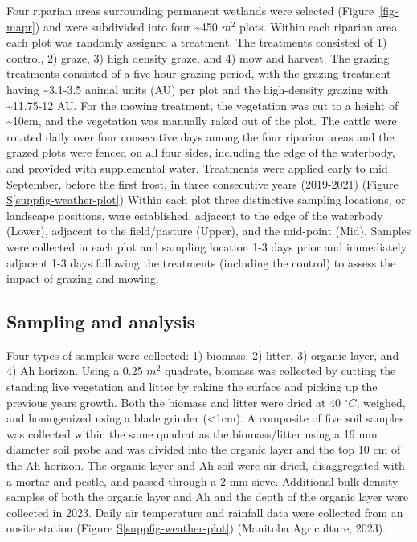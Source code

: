 \documentclass[
]{agujournal2019}
\newcommand*\quartosuppfigref[1]{Figure \hyperref[#1]{S\ref{#1}}}
\begin{document}
Four riparian areas surrounding permanent wetlands were selected
(Figure~\ref{fig-mapr}) and were subdivided into four \textasciitilde450
\(m^2\) plots. Within each riparian area, each plot was randomly
assigned a treatment. The treatments consisted of 1) control, 2) graze,
3) high density graze, and 4) mow and harvest. The grazing treatments
consisted of a five-hour grazing period, with the grazing treatment
having \textasciitilde3.1-3.5 animal units (AU) per plot and the
high-density grazing with \textasciitilde11.75-12 AU. For the mowing
treatment, the vegetation was cut to a height of \textasciitilde10cm,
and the vegetation was manually raked out of the plot. The cattle were
rotated daily over four consecutive days among the four riparian areas
and the grazed plots were fenced on all four sides, including the edge
of the waterbody, and provided with supplemental water. Treatments were
applied early to mid September, before the first frost, in three
consecutive years (2019-2021) (\quartosuppfigref{suppfig-weather-plot})
Within each plot three distinctive sampling locations, or landscape
positions, were established, adjacent to the edge of the waterbody
(Lower), adjacent to the field/pasture (Upper), and the mid-point (Mid).
Samples were collected in each plot and sampling location 1-3 days prior
and immediately adjacent 1-3 days following the treatments (including
the control) to assess the impact of grazing and mowing.

\subsection{Sampling and analysis}\label{sampling-and-analysis}

Four types of samples were collected: 1) biomass, 2) litter, 3) organic
layer, and 4) Ah horizon. Using a 0.25 \(m^2\) quadrate, biomass was
collected by cutting the standing live vegetation and litter by raking
the surface and picking up the previous years growth. Both the biomass
and litter were dried at 40 \(^\circ C\), weighed, and homogenized using
a blade grinder (\textless1cm). A composite of five soil samples was
collected within the same quadrat as the biomass/litter using a 19 mm
diameter soil probe and was divided into the organic layer and the top
10 cm of the Ah horizon. The organic layer and Ah soil were air-dried,
disaggregated with a mortar and pestle, and passed through a 2-mm sieve.
Additional bulk density samples of both the organic layer and Ah and the
depth of the organic layer were collected in 2023. Daily air temperature
and rainfall data were collected from an onsite station
(\quartosuppfigref{suppfig-weather-plot}) (Manitoba Agriculture, 2023).
\end{document}
